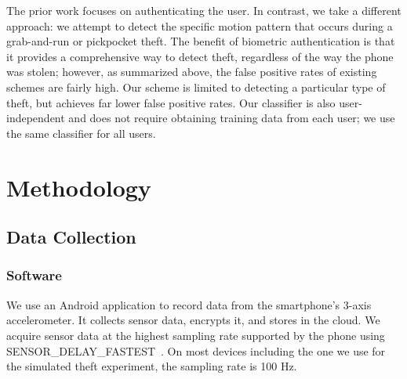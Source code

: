 The prior work focuses on authenticating the user.
In contrast, we take a different approach: we attempt to detect the
specific motion pattern that occurs during a grab-and-run or pickpocket theft.
The benefit of biometric authentication is that it provides a comprehensive
way to detect theft, regardless of the way the phone was stolen; however,
as summarized above, the false positive rates of existing schemes
are fairly high.
Our scheme is limited to detecting a particular type of theft, but achieves
far lower false positive rates.
Our classifier is also user-independent and does not require obtaining
training data from each user; we use the same classifier for all users.




\section{Methodology}

\subsection{Data Collection}

\subsubsection{Software}
We use an Android application to record data from the smartphone's 3-axis accelerometer.
It collects sensor data, encrypts it, and stores in the cloud.
We acquire sensor data at the highest sampling rate supported by the phone using SENSOR\_DELAY\_FASTEST~\cite{android:doc}. 
On most devices including the one we use for the simulated theft experiment, the sampling rate is 100 Hz. 

